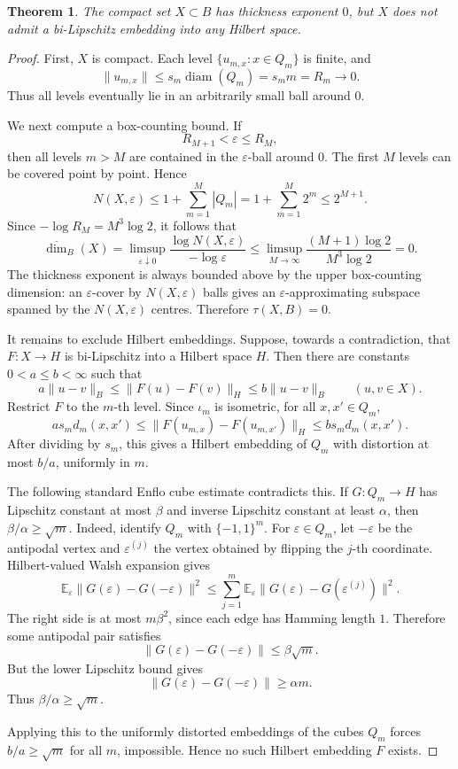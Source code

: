 \documentclass[11pt]{article}
\newtheorem{theorem}{Theorem}
\newcommand{\diam}{\operatorname{diam}}
\begin{document}
\begin{theorem}
The compact set \(X\subset B\) has thickness exponent \(0\), but \(X\) does
not admit a bi-Lipschitz embedding into any Hilbert space.
\end{theorem}

\begin{proof}
First, \(X\) is compact. Each level \(\{u_{m,x}:x\in Q_m\}\) is finite, and
\[
  \|u_{m,x}\|\le s_m\diam(Q_m)=s_m m=R_m\to 0.
\]
Thus all levels eventually lie in an arbitrarily small ball around \(0\).

We next compute a box-counting bound. If
\[
  R_{M+1}<\varepsilon\le R_M,
\]
then all levels \(m>M\) are contained in the \(\varepsilon\)-ball around \(0\).
The first \(M\) levels can be covered point by point. Hence
\[
  N(X,\varepsilon)\le 1+\sum_{m=1}^M |Q_m|
  =1+\sum_{m=1}^M 2^m
  \le 2^{M+1}.
\]
Since \(-\log R_M=M^3\log 2\), it follows that
\[
  \overline{\dim}_B(X)
  =\limsup_{\varepsilon\downarrow 0}
      \frac{\log N(X,\varepsilon)}{-\log\varepsilon}
  \le
  \limsup_{M\to\infty}\frac{(M+1)\log 2}{M^3\log 2}=0.
\]
The thickness exponent is always bounded above by the upper box-counting
dimension: an \(\varepsilon\)-cover by \(N(X,\varepsilon)\) balls gives an
\(\varepsilon\)-approximating subspace spanned by the \(N(X,\varepsilon)\)
centres. Therefore \(\tau(X,B)=0\).

It remains to exclude Hilbert embeddings. Suppose, towards a contradiction,
that \(F:X\to H\) is bi-Lipschitz into a Hilbert space \(H\). Then there are
constants \(0<a\le b<\infty\) such that
\[
  a\|u-v\|_B\le \|F(u)-F(v)\|_H\le b\|u-v\|_B
  \qquad (u,v\in X).
\]
Restrict \(F\) to the \(m\)-th level. Since \(\iota_m\) is isometric, for
all \(x,x'\in Q_m\),
\[
  a s_m d_m(x,x')
  \le \|F(u_{m,x})-F(u_{m,x'})\|_H
  \le b s_m d_m(x,x').
\]
After dividing by \(s_m\), this gives a Hilbert embedding of \(Q_m\) with
distortion at most \(b/a\), uniformly in \(m\).

The following standard Enflo cube estimate contradicts this. If
\(G:Q_m\to H\) has Lipschitz constant at most \(\beta\) and inverse
Lipschitz constant at least \(\alpha\), then \(\beta/\alpha\ge \sqrt m\).
Indeed, identify \(Q_m\) with \(\{-1,1\}^m\). For \(\varepsilon\in Q_m\), let
\(-\varepsilon\) be the antipodal vertex and \(\varepsilon^{(j)}\) the vertex
obtained by flipping the \(j\)-th coordinate. Hilbert-valued Walsh expansion
gives
\[
  \mathbb E_\varepsilon \|G(\varepsilon)-G(-\varepsilon)\|^2
  \le
  \sum_{j=1}^m
  \mathbb E_\varepsilon \|G(\varepsilon)-G(\varepsilon^{(j)})\|^2 .
\]
The right side is at most \(m\beta^2\), since each edge has Hamming length
\(1\). Therefore some antipodal pair satisfies
\[
  \|G(\varepsilon)-G(-\varepsilon)\|\le \beta\sqrt m.
\]
But the lower Lipschitz bound gives
\[
  \|G(\varepsilon)-G(-\varepsilon)\|\ge \alpha m.
\]
Thus \(\beta/\alpha\ge \sqrt m\).

Applying this to the uniformly distorted embeddings of the cubes \(Q_m\)
forces \(b/a\ge \sqrt m\) for all \(m\), impossible. Hence no such Hilbert
embedding \(F\) exists.
\end{proof}
\end{document}
